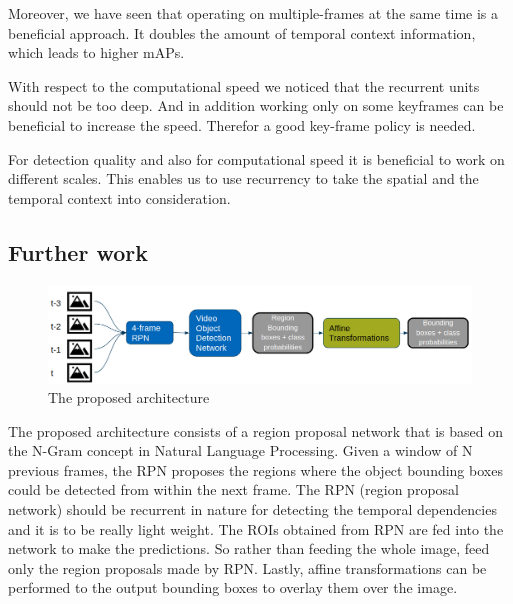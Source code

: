 \documentclass[conference]{IEEEtran}
\begin{document}
Moreover, we have seen that operating on multiple-frames at the same time is a beneficial approach. It doubles the amount of temporal context information, which leads to higher mAPs. \newline

With respect to the computational speed we noticed that the recurrent units should not be too deep. And in addition working only on some keyframes can be beneficial to increase the speed. Therefor a good key-frame policy is needed. \newline

For detection quality and also for computational speed it is beneficial to work on different scales. This enables us to use recurrency to take the spatial and the temporal context into consideration. 

\subsection{Further work}
\begin{figure} [h]
\includegraphics[width=\columnwidth]{Further_Work}
\caption{The proposed architecture} 
\end{figure}

The proposed architecture consists of a region proposal network \cite{b38} that is based on the N-Gram concept in Natural Language Processing. Given a window of N previous frames, the RPN proposes the regions where the object bounding boxes could be detected from within the next frame. The RPN (region proposal network) should be recurrent in nature for detecting the temporal dependencies and it is to be really light weight. The ROIs obtained from RPN are fed into the network to make the predictions. So rather than feeding the whole image, feed only the region proposals made by RPN. Lastly, affine transformations can be performed to the output bounding boxes to overlay them over the image.
\end{document}
